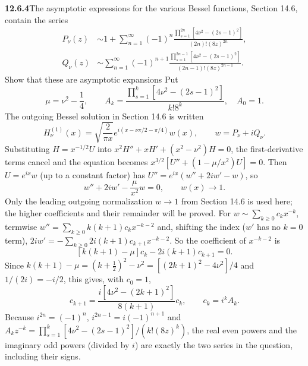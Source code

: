 \par\bigskip
\noindent\textbf{12.6.4}\quad The asymptotic expressions for the various
Bessel functions, Section 14.6, contain the series
\begin{align*}
P_{\nu}(z)&\sim1+\sum_{n=1}^{\infty}(-1)^{n}
\frac{\prod_{s=1}^{2n}[4\nu^{2}-(2s-1)^{2}]}{(2n)!(8z)^{2n}},\\
Q_{\nu}(z)&\sim\sum_{n=1}^{\infty}(-1)^{n+1}
\frac{\prod_{s=1}^{2n-1}[4\nu^{2}-(2s-1)^{2}]}{(2n-1)!(8z)^{2n-1}}.
\end{align*}
Show that these are asymptotic expansions 
\solution
{}
Put
\[
\mu=\nu^2-\frac14,\qquad
A_k=\frac{\prod_{s=1}^k[4\nu^2-(2s-1)^2]}{k!8^k},\quad A_0=1.
\]
The outgoing Bessel solution in Section 14.6 is written
\[
H_\nu^{(1)}(x)=\sqrt{\frac2{\pi x}}
 e^{i(x-\nu\pi/2-\pi/4)}w(x),\qquad w=P_\nu+iQ_\nu.
\]
Substituting $H=x^{-1/2}U$ into $x^2H''+xH'+(x^2-\nu^2)H=0$, the
first-derivative terms cancel and the equation becomes
$x^{3/2}[U''+(1-\mu/x^2)U]=0$. Then $U=e^{ix}w$ (up to a constant
factor) has $U''=e^{ix}(w''+2iw'-w)$, so
\[
w''+2iw'-\frac\mu{x^2}w=0,\qquad w(x)\to1.
\]
Only the leading outgoing normalization $w\to1$ from Section 14.6
is used here; the higher coefficients and their remainder will be proved.
For $w\sim\sum_{k\ge0}c_kx^{-k}$, termwise
$w''=\sum_{k\ge0}k(k+1)c_kx^{-k-2}$ and, shifting the index ($w'$ has
no $k=0$ term),
$2iw'=-\sum_{k\ge0}2i(k+1)c_{k+1}x^{-k-2}$. So the coefficient of
$x^{-k-2}$ is
\[
[k(k+1)-\mu]c_k-2i(k+1)c_{k+1}=0.
\]
Since $k(k+1)-\mu=(k+\frac12)^2-\nu^2=[(2k+1)^2-4\nu^2]/4$ and
$1/(2i)=-i/2$, this gives, with $c_0=1$,
\[
c_{k+1}=\frac{i[4\nu^2-(2k+1)^2]}{8(k+1)}c_k,\qquad
c_k=i^kA_k.
\]
Because $i^{2n}=(-1)^n$, $i^{2n-1}=i(-1)^{n+1}$ and
$A_kz^{-k}=\prod_{s=1}^k[4\nu^2-(2s-1)^2]/(k!(8z)^k)$, the real even
powers and the imaginary odd powers (divided by $i$) are exactly the
two series in the question, including their signs.

